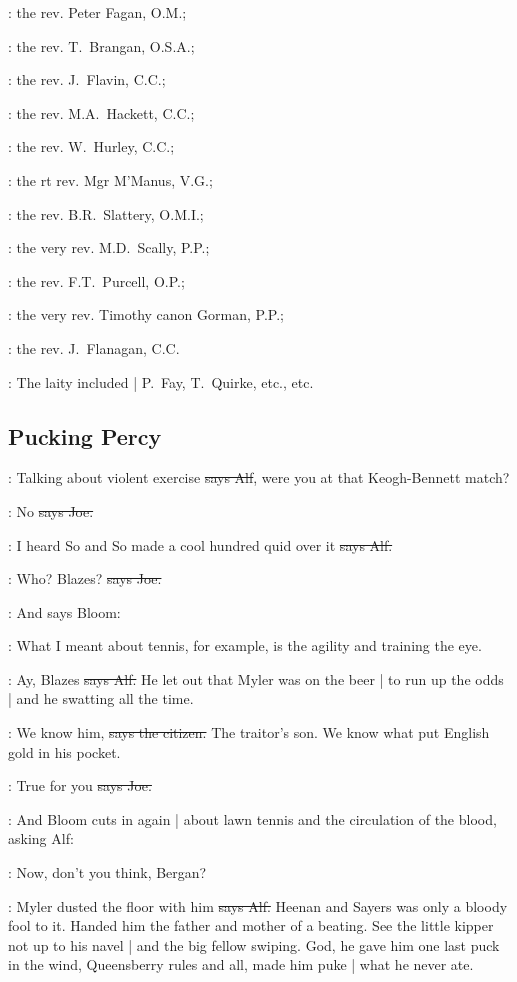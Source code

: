 :
the rev. Peter Fagan, O.M.;

:
the rev. T.~Brangan, O.S.A.;

:
the rev. J.~Flavin, C.C.;

:
the rev. M.A.~Hackett, C.C.;

:
the rev. W.~Hurley, C.C.;

:
the rt rev. Mgr M'Manus, V.G.;

:
the rev. B.R.~Slattery, O.M.I.;

:
the very rev. M.D.~Scally, P.P.;

:
the rev. F.T.~Purcell, O.P.;

:
the very rev. Timothy canon Gorman, P.P.;

:
the rev. J.~Flanagan, C.C.

:
The laity included |
P.~Fay,
T.~Quirke,
etc.,
etc.


\subsection*{Pucking Percy}

\bergan:
Talking about violent exercise
\sout{says Alf},
were you at that Keogh-Bennett match?

\joe:
No
\sout{says Joe.}

\bergan:
I heard So and So made a cool hundred quid over it
\sout{says Alf.}

\joe:
Who?
Blazes?
\sout{says Joe.}

\Nq:
And says Bloom:

\Bloom:
What I meant about tennis,
for example,
is the agility and training the eye.

\bergan:
Ay,
Blazes
\sout{says Alf.}
He let out that Myler was on the beer |
to run up the odds |
and he swatting all the time.

\citizen:
We know him,
\sout{says the citizen.}
The traitor's son.
We know what put English gold in his pocket.

\joe:
True for you
\sout{says Joe.}

\Nq:
And Bloom cuts in again |
about lawn tennis and the circulation of the blood,
asking Alf:

\Bloom:
Now,
don't you think,
Bergan?

\bergan:
Myler dusted the floor with him
\sout{says Alf.}
Heenan and Sayers was only a bloody fool to it.
Handed him the father and mother of a beating.
See the little kipper not up to his navel |
and the big fellow swiping.
God,
he gave him one last puck in the wind,
Queensberry rules and all,
made him puke |
what he never ate.

